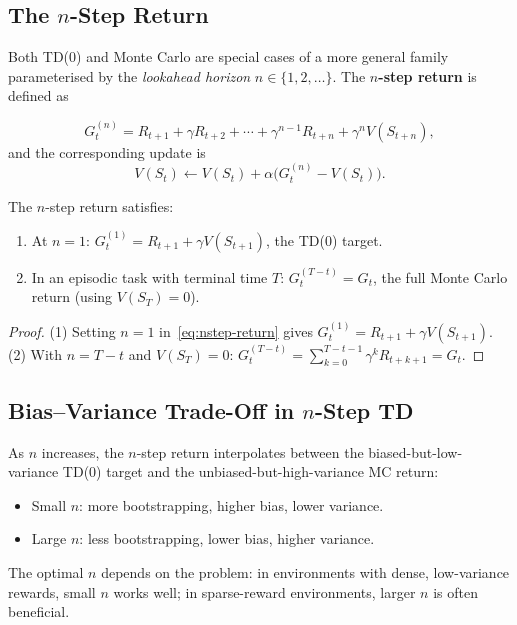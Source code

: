 \subsection{The $n$-Step Return}

Both TD(0) and Monte Carlo are special cases of a more general family parameterised by the \emph{lookahead horizon} $n\in\{1,2,\dots\}$.  The \textbf{$n$-step return} is defined as

\begin{equation}
\label{eq:nstep-return}
G_t^{(n)} = R_{t+1} + \gamma R_{t+2} + \cdots + \gamma^{n-1}R_{t+n} + \gamma^n V(S_{t+n}),
\end{equation}
and the corresponding update is
\begin{equation}
\label{eq:nstep-update}
V(S_t) \leftarrow V(S_t) + \alpha\bigl(G_t^{(n)} - V(S_t)\bigr).
\end{equation}

\begin{proposition}
The $n$-step return satisfies:
\begin{enumerate}
  \item At $n=1$: $G_t^{(1)} = R_{t+1}+\gamma V(S_{t+1})$, the TD(0) target.
  \item In an episodic task with terminal time $T$: $G_t^{(T-t)} = G_t$, the full Monte Carlo return (using $V(S_T)=0$).
\end{enumerate}
\end{proposition}

\begin{proof}
(1) Setting $n=1$ in~\eqref{eq:nstep-return} gives $G_t^{(1)} = R_{t+1}+\gamma V(S_{t+1})$.  (2) With $n=T-t$ and $V(S_T)=0$: $G_t^{(T-t)} = \sum_{k=0}^{T-t-1}\gamma^k R_{t+k+1} = G_t$.
\end{proof}

\subsection{Bias--Variance Trade-Off in $n$-Step TD}

As $n$ increases, the $n$-step return interpolates between the biased-but-low-variance TD(0) target and the unbiased-but-high-variance MC return:
\begin{itemize}[leftmargin=*]
  \item Small $n$: more bootstrapping, higher bias, lower variance.
  \item Large $n$: less bootstrapping, lower bias, higher variance.
\end{itemize}
The optimal $n$ depends on the problem: in environments with dense, low-variance rewards, small $n$ works well; in sparse-reward environments, larger $n$ is often beneficial.

